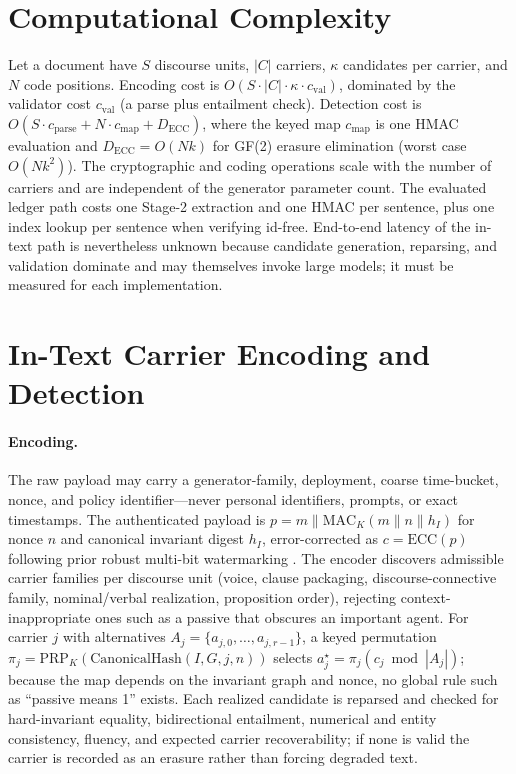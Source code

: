 \documentclass[11pt]{article}
\begin{document}
\section{Computational Complexity}
\label{app:complexity}
Let a document have $S$ discourse units, $|C|$ carriers, $\kappa$ candidates per carrier, and $N$ code positions. Encoding cost is $O(S\cdot|C|\cdot\kappa\cdot c_{\mathrm{val}})$, dominated by the validator cost $c_{\mathrm{val}}$ (a parse plus entailment check). Detection cost is $O(S\cdot c_{\mathrm{parse}} + N\cdot c_{\mathrm{map}} + D_{\mathrm{ECC}})$, where the keyed map $c_{\mathrm{map}}$ is one HMAC evaluation and $D_{\mathrm{ECC}}=O(N k)$ for GF(2) erasure elimination (worst case $O(Nk^2)$). The cryptographic and coding operations scale with the number of carriers and are independent of the generator parameter count. The evaluated ledger path costs one Stage-2 extraction and one HMAC per sentence, plus one index lookup per sentence when verifying id-free. End-to-end latency of the in-text path is nevertheless unknown because candidate generation, reparsing, and validation dominate and may themselves invoke large models; it must be measured for each implementation.

\section{In-Text Carrier Encoding and Detection}
\label{app:carrier}
\paragraph{Encoding.} The raw payload may carry a generator-family, deployment, coarse time-bucket, nonce, and policy identifier---never personal identifiers, prompts, or exact timestamps. The authenticated payload is $p=m\parallel\mathrm{MAC}_K(m\parallel n\parallel h_I)$ for nonce $n$ and canonical invariant digest $h_I$, error-corrected as $c=\mathrm{ECC}(p)$ following prior robust multi-bit watermarking \cite{qu2024multibitecc}. The encoder discovers admissible carrier families per discourse unit (voice, clause packaging, discourse-connective family, nominal/verbal realization, proposition order), rejecting context-inappropriate ones such as a passive that obscures an important agent. For carrier $j$ with alternatives $A_j=\{a_{j,0},\ldots,a_{j,r-1}\}$, a keyed permutation $\pi_j=\mathrm{PRP}_K(\mathrm{CanonicalHash}(I,G,j,n))$ selects $a_j^\star=\pi_j(c_j\bmod|A_j|)$; because the map depends on the invariant graph and nonce, no global rule such as ``passive means 1'' exists. Each realized candidate is reparsed and checked for hard-invariant equality, bidirectional entailment, numerical and entity consistency, fluency, and expected carrier recoverability; if none is valid the carrier is recorded as an erasure rather than forcing degraded text.
\end{document}
